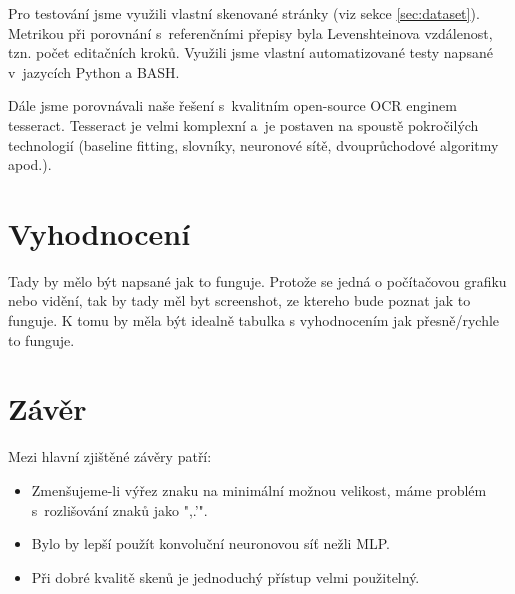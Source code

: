 \documentclass[12pt]{article}
\begin{document}
Pro testování jsme využili vlastní skenované stránky (viz sekce \ref{sec:dataset}). Metrikou
při porovnání s~referenčními přepisy byla Levenshteinova vzdálenost, tzn. počet editačních kroků. \cite{lev}
Využili jsme vlastní automatizované testy napsané v~jazycích Python a BASH.

Dále jsme porovnávali naše řešení s~kvalitním open-source OCR enginem tesseract. \cite{tess} Tesseract
je velmi komplexní a~je postaven na spoustě pokročilých technologií (baseline fitting, slovníky, neuronové sítě,
dvouprůchodové algoritmy apod.). \cite{tess2}


\section{Vyhodnocení}

Tady by mělo být napsané jak to funguje. Protože se jedná o počítačovou grafiku nebo 
vidění, tak by tady měl byt screenshot, ze ktereho bude poznat jak to funguje.
K tomu by měla být idealně tabulka s vyhodnocením jak přesně/rychle to funguje. 


\section{Závěr}

Mezi hlavní zjištěné závěry patří:

\begin{itemize}
  \item Zmenšujeme-li výřez znaku na minimální možnou velikost, máme problém s~rozlišování znaků jako ",.'".
  \item Bylo by lepší použít konvoluční neuronovou síť nežli MLP.
  \item Při dobré kvalitě skenů je jednoduchý přístup velmi použitelný.
\end{itemize}


\begin{flushleft}
  
\end{flushleft}

\end{document}
